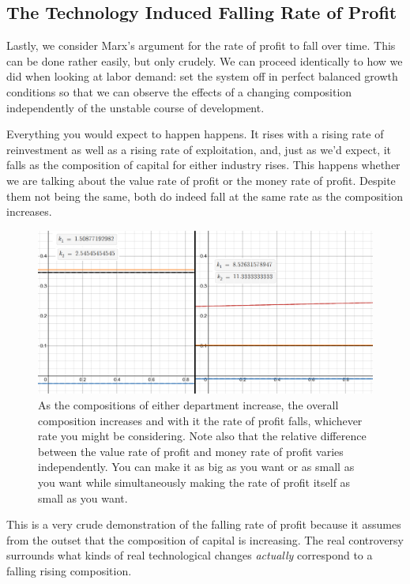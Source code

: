 \documentclass{article}
\theoremstyle{theorem}
\begin{document}
\subsection{The Technology Induced Falling Rate of Profit}
Lastly, we consider Marx's argument for the rate of profit to fall over time. This can be done rather easily, but only crudely. We can proceed identically to how we did when looking at labor demand: set the system off in perfect balanced growth conditions so that we can observe the effects of a changing composition independently of the unstable course of development. \par 
Everything you would expect to happen happens. It rises with a rising rate of reinvestment as well as a rising rate of exploitation, and, just as we'd expect, it falls as the composition of capital for either industry rises. This happens whether we are talking about the value rate of profit or the money rate of profit. Despite them not being the same, both do indeed fall at the same rate as the composition increases. 
\begin{figure}[H]
\centering
\includegraphics[scale=.6]{Images/theFallingRatesOfProfit}
\caption{As the compositions of either department increase, the overall composition increases and with it the rate of profit falls, whichever rate you might be considering. Note also that the relative difference between the value rate of profit and money rate of profit varies independently. You can make it as big as you want or as small as you want while simultaneously making the rate of profit itself as small as you want.}
\end{figure}
This is a very crude demonstration of the falling rate of profit because it assumes from the outset that the composition of capital is increasing. The real controversy surrounds what kinds of real technological changes \emph{actually} correspond to a falling rising composition. \par  
\end{document}
